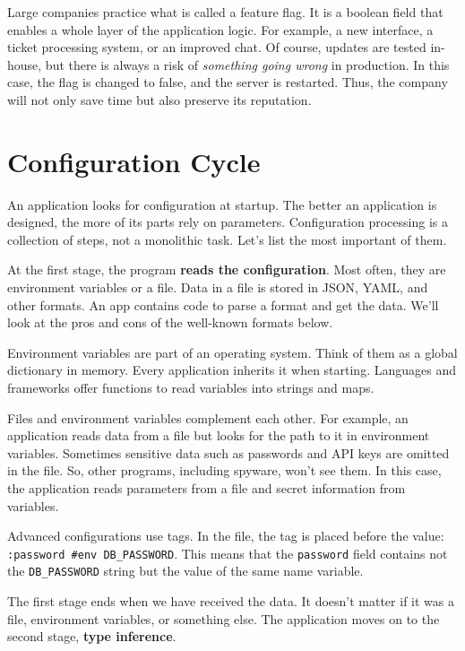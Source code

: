 
Large companies practice what is called a feature flag. It is a boolean field that enables a whole layer of the application logic. For example, a new interface, a ticket processing system, or an improved chat. Of course, updates are tested in-house, but there is always a risk of \emph{something going wrong} in production. In this case, the flag is changed to false, and the server is restarted. Thus, the company will not only save time but also preserve its reputation.

\label{feature-flags}

\section{Configuration Cycle}

An application looks for configuration at startup. The better an application is designed, the more of its parts rely on parameters. Configuration processing is a collection of steps, not a monolithic task. Let's list the most important of them.

At the first stage, the program \textbf{reads the configuration}. Most often, they are environment variables or a file. Data in a file is stored in JSON, YAML, and other formats. An app contains code to parse a format and get the data. We'll look at the pros and cons of the well-known formats below.

Environment variables are part of an operating system. Think of them as a global dictionary in memory. Every application inherits it when starting. Languages and frameworks offer functions to read variables into strings and maps.

Files and environment variables complement each other. For example, an application reads data from a file but looks for the path to it in environment variables. Sometimes sensitive data such as passwords and API keys are omitted in the file. So, other programs, including spyware, won't see them. In this case, the application reads parameters from a file and secret information from variables.


Advanced configurations use tags. In the file, the tag is placed before the value: \verb|:password #env DB_PASSWORD|. This means that the \verb|password| field contains not the \verb|DB_PASSWORD| string but the value of
the same name variable.

The first stage ends when we have received the data. It doesn't matter if it was a file, environment variables, or something else. The application moves on to the second stage, \textbf{type inference}.

